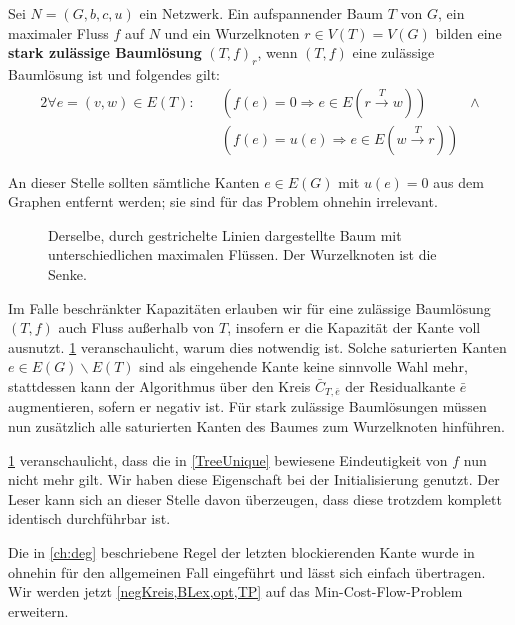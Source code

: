 \begin{defn}Sei $N=(G,b,c,u)$ ein Netzwerk. Ein aufspannender Baum $T$ von $G$, ein maximaler Fluss $f$ auf $N$ und ein Wurzelknoten $r\in V(T)=V(G)$ bilden eine \textbf{stark zulässige Baumlösung} $(T,f)_r$, wenn $(T,f)$ eine zulässige Baumlösung ist und folgendes gilt:
\begin{alignat*}{2}
\forall e=(v,w)\in E(T)\colon\quad&(f(e)=0 \Rightarrow e\in E(r\xrightarrow{T}w))&\land\\
&(f(e)=u(e) \Rightarrow e\in E(w\xrightarrow{T}r))
\end{alignat*}\end{defn}
\begin{anm}An dieser Stelle sollten sämtliche Kanten $e\in E(G)$ mit $u(e)=0$ aus dem Graphen entfernt werden; sie sind für das Problem ohnehin irrelevant.\end{anm}

\begin{figure}[!ht]\centering
		
	\caption{Derselbe, durch gestrichelte Linien dargestellte Baum mit unterschiedlichen maximalen Flüssen. Der Wurzelknoten ist die Senke.}
	\label{fig:NSA}
\end{figure}

Im Falle beschränkter Kapazitäten erlauben wir für eine zulässige Baumlösung $(T,f)$ auch Fluss außerhalb von $T$, insofern er die Kapazität der Kante voll ausnutzt. \cref{fig:NSA} veranschaulicht, warum dies notwendig ist. Solche saturierten Kanten $e\in E(G)\backslash E(T)$ sind als eingehende Kante keine sinnvolle Wahl mehr, stattdessen kann der Algorithmus über den Kreis $\bar{C}_{T,\bar{e}}$ der Residualkante $\bar{e}$ augmentieren, sofern er negativ ist. Für stark zulässige Baumlösungen müssen nun zusätzlich alle saturierten Kanten des Baumes zum Wurzelknoten hinführen.

\cref{fig:NSA} veranschaulicht, dass die in \cref{TreeUnique} bewiesene Eindeutigkeit von $f$ nun nicht mehr gilt. Wir haben diese Eigenschaft bei der Initialisierung genutzt. Der Leser kann sich an dieser Stelle davon überzeugen, dass diese trotzdem komplett identisch durchführbar ist.

Die in \cref{ch:deg} beschriebene Regel der letzten blockierenden Kante wurde in \cite{cycling} ohnehin für den allgemeinen Fall eingeführt und lässt sich einfach übertragen. Wir werden jetzt \cref{negKreis,BLex,opt,TP} auf das Min-Cost-Flow-Problem erweitern.

